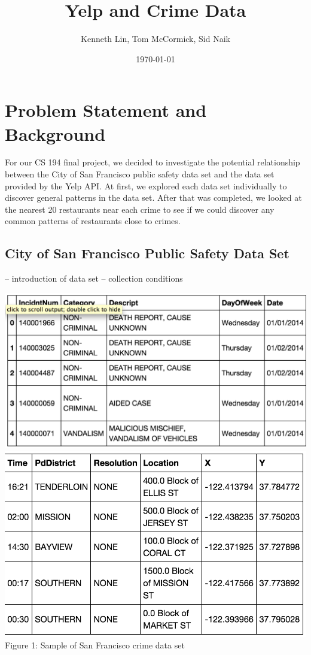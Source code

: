 \documentclass{article}
\title{Yelp and Crime Data}  %
\author{Kenneth Lin, Tom McCormick, Sid Naik}
\date{\today}
\begin{document}
\maketitle

\section{Problem Statement and Background}

For our CS 194 final project, we decided to investigate the potential
relationship between the City of San Francisco public safety data set and
the data set provided by the Yelp API. At first, we explored each data set
individually to discover general patterns in the data set. After that was
completed, we looked at the nearest 20 restaurants near each crime to see
if we could discover any common patterns of restaurants close to crimes.

\subsection{City of San Francisco Public Safety Data Set}

-- introduction of data set
-- collection conditions

\begin{center}
  \includegraphics[scale=0.5]{sf_city_sample_1.png} \\
  \includegraphics[scale=0.5]{sf_city_sample_2.png} \\
  Figure 1: Sample of San Francisco crime data set
\end{center}
\end{document}
